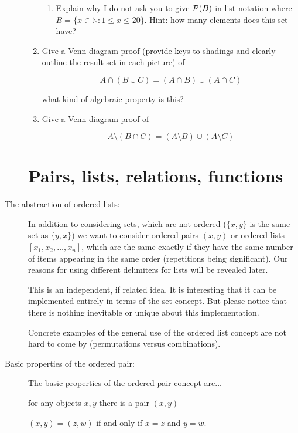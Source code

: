 \documentclass[12pt]{article}
\begin{document}
\begin{description}
\begin{enumerate}
\begin{enumerate}
\item Explain why I do not ask you to give ${\cal P}(B)$ in list notation where $B = \{x \in {\mathbb N}:1 \leq x \leq 20\}$.  Hint:  how many elements does this set have?
\end{enumerate}
\item Give a Venn diagram proof (provide keys to shadings and clearly outline the result set in each picture) of

$$A \cap (B \cup C) = (A \cap B) \cup (A \cap C)$$

what kind of algebraic property is this?

\item  Give a Venn diagram proof of

$$A \setminus (B \cap C) = (A \setminus B) \cup (A \setminus C)$$




\end{enumerate}

\newpage

\section{Pairs, lists, relations, functions}


\item[The abstraction of ordered lists:]

In addition to considering sets, which are not ordered ($\{x,y\}$ is the same set as $\{y,x\}$) we want to consider
ordered pairs $(x,y)$ or ordered lists $[x_1,x_2,\ldots,x_n]$, which are the same exactly if they have the same number of items appearing in the same order (repetitions being significant).  Our reasons for using different delimiters for lists will be revealed later.

This is an independent, if related idea.  It is interesting that it can be implemented entirely in terms of the set concept.  But please notice that there is nothing inevitable or unique about this implementation.

Concrete examples of the general use of the ordered list concept are not hard to come by (permutations versus combinations).

\item[Basic properties of the ordered pair:]

The basic properties of the ordered pair concept are...

for any objects $x,y$ there is a pair $(x,y)$

$(x,y) = (z,w)$ if and only if $x=z$ and $y=w$.


\end{description}
\end{document}
